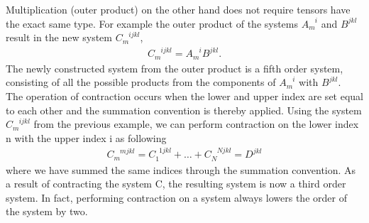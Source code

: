 \documentclass[main.tex]{subfiles}
\begin{document}
\begin{example}
Multiplication (outer product) on the other hand does not require tensors have the exact 
same type. For example the outer product of the systems $A^{\phantom{m}i}_m$ and 
$B^{jkl}$ result in the new system
$C_m^{\phantom{m}ijkl}$,
\begin{align*}
C_{m}^{\phantom{m}ijkl} = A^{\phantom{m}i}_mB^{jkl}.
\end{align*}
The newly constructed system from the outer product is a fifth order system, consisting of all 
the possible products from the components of $A^{\phantom{m}i}_m$ with $B^{jkl}$. 
\\

The operation of contraction occurs when the lower and upper index are set equal to each other
and the summation convention is thereby applied. Using the system $C_m^{\phantom{m}ijkl}$ 
from the previous example, we can perform contraction on the lower index n with the upper 
index i as following
\begin{align*}
C^{\phantom{m}mjkl}_{m} = C^{\phantom{1}1jkl}_{1} + \dots + C^{\phantom{N}Njkl}_{N}
= D^{jkl}
\end{align*}
where we have summed the same indices through the summation convention. As a result of 
contracting the system C, the resulting system is now a third order system. In fact, performing
contraction on a system always lowers the order of the system by two. 
\\


\end{example}
\end{document}
